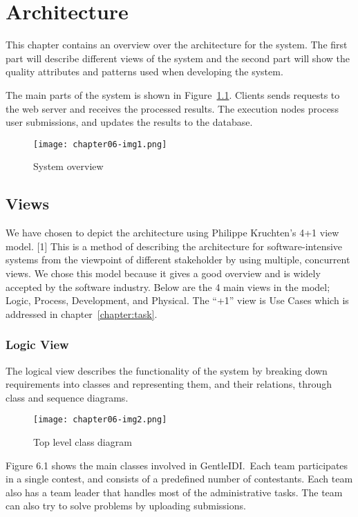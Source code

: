 
\chapter{Architecture}

This chapter contains an overview over the architecture for the system.
The first part will describe different views of the system and the
second part will show the quality attributes and patterns used when
developing the system.




The main parts of the system is shown in Figure~\ref{fig:systemOverview}. Clients sends
requests to the web server and receives the processed results. The
execution nodes process user submissions, and updates the results to
the database. 
\begin{figure}[t]
    \centering
 	\texttt{[image: chapter06-img1.png]} 
 	\caption{System overview}
 	\label{fig:systemOverview}
\end{figure}

\section{Views}

We have chosen to depict the architecture using Philippe
Kruchten's 4+1 view model. [1] This is a method of
describing the architecture for software-intensive systems from the
viewpoint of different stakeholder by using multiple, concurrent views.
We chose this model because it gives a good overview and is widely
accepted by the software industry. Below are the 4 main views in the
model; Logic, Process, Development, and Physical. The
``+1'' view is Use Cases which is
addressed in chapter~\ref{chapter:task}.

\subsection{Logic View}
The logical view describes the functionality of the system by breaking
down requirements into classes and representing them, and their
relations, through class and sequence diagrams.
\begin{figure}[h!]
    \centering
	\texttt{[image: chapter06-img2.png]} 
	\caption{Top level class diagram}
\end{figure}

Figure 6.1 shows the main classes involved in GentleIDI.\ Each team
participates in a single contest, and consists of a predefined number
of contestants. Each team also has a team leader that handles most of
the administrative tasks. The team can also try to solve problems by
uploading submissions. 

